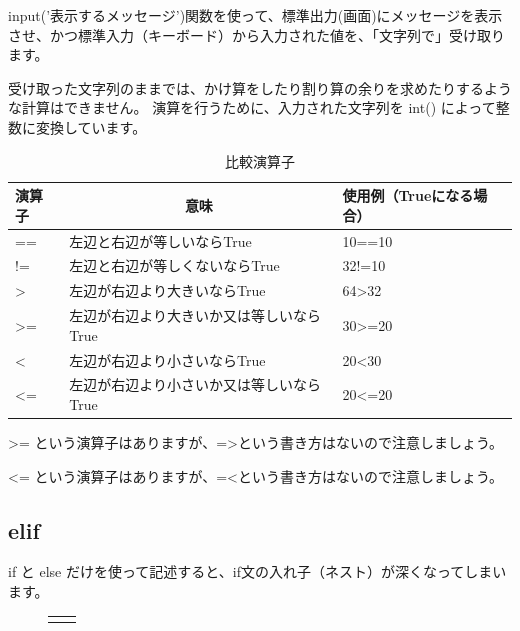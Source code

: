 \documentclass[uplatex,a4paper,11pt,oneside,openany]{jsbook}
\begin{document}
input('表示するメッセージ')関数を使って、標準出力(画面)にメッセージを表示させ、かつ標準入力（キーボード）から入力された値を、「文字列で」受け取ります。

受け取った文字列のままでは、かけ算をしたり割り算の余りを求めたりするような計算はできません。
演算を行うために、入力された文字列を int() によって整数に変換しています。


\begin{table}[hbtp]
  \caption{比較演算子}
  \label{table:ope}
  \centering
  \begin{tabular}{l|l|l}
    \hline
    演算子  & \multicolumn{1}{c|}{意味}  &  使用例（Trueになる場合）\\
    \hline \hline
    ==  & 左辺と右辺が等しいならTrue & 10==10 \\
    !=  & 左辺と右辺が等しくないならTrue & 32!=10 \\
    \textgreater  & 左辺が右辺より大きいならTrue & 64\textgreater32 \\
    \textgreater=  & 左辺が右辺より大きいか又は等しいならTrue & 30\textgreater=20 \\
    \textless  & 左辺が右辺より小さいならTrue & 20\textless30 \\
    \textless=  & 左辺が右辺より小さいか又は等しいならTrue & 20\textless=20 \\
    \hline
  \end{tabular}
\end{table}

\textgreater= という演算子はありますが、=\textgreater という書き方はないので注意しましょう。

\textless= という演算子はありますが、=\textless という書き方はないので注意しましょう。

\subsection{elif}

if と else だけを使って記述すると、if文の入れ子（ネスト）が深くなってしまいます。

\begin{figure}[H]
  \centering
  \begin{tabular}{lr}
      \begin{minipage}{0.9\hsize}
      \centering

      \end{minipage}
      \begin{minipage}{0.1\hsize}
      \flushright
      \end{minipage}
    \end{tabular}
\end{figure}%
\end{document}
